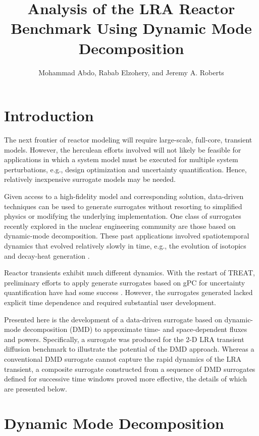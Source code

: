 \documentclass{anstrans}
\title{Analysis of the LRA Reactor Benchmark Using Dynamic Mode Decomposition}
\author{Mohammad Abdo, Rabab Elzohery, and Jeremy A. Roberts}
\institute{
Department of Mechanical \& Nuclear Engineering, Kansas State University, Manhattan, KS 66506
}
\begin{document}
\section{Introduction}

The next frontier of reactor modeling will require large-scale, full-core, transient models.
However, the herculean efforts involved will not likely be feasible for applications in which a system model must be executed for multiple system perturbations, e.g., design optimization and uncertainty quantification.
Hence, relatively  inexpensive surrogate models may be needed.

Given access to a high-fidelity model and corresponding solution, data-driven techniques can be used to generate surrogates without resorting to simplified physics or modifying the underlying implementation.  
One class of surrogates recently explored in the nuclear engineering community are those based on dynamic-mode decomposition.  
These past applications involved spatiotemporal dynamics that evolved relatively slowly in time, e.g., the evolution of isotopics \cite{} and decay-heat generation \cite{}.

Reactor transients exhibit much different dynamics.
With the restart of TREAT, preliminary efforts to apply generate surrogates based on gPC for uncertainty quantification have had some success \cite{}.
However, the surrogates generated lacked explicit time dependence and required substantial user development.

Presented here is the development of a data-driven surrogate based on dynamic-mode decomposition (DMD) to approximate time- and space-dependent fluxes and powers.
Specifically, a surrogate was produced for the 2-D LRA transient diffusion benchmark to illustrate the potential of the DMD approach. 
Whereas a conventional DMD surrogate cannot capture the rapid dynamics of the LRA transient, a composite surrogate constructed from a sequence of DMD surrogates defined for successive time windows proved more effective, the details of which are presented below.


\section{Dynamic Mode Decomposition}
\label{sec:backgound}
\end{document}
